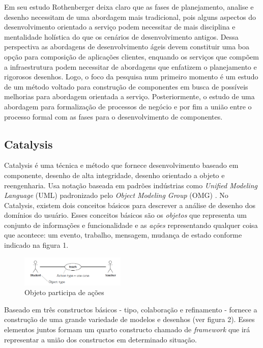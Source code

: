 \documentclass[
	article,			%
	11pt,				%
	oneside,			%
	a4paper,			%
	english,			%
	brazil,				%
	sumario=tradicional
	]{abntex2}
\begin{document}
Em seu estudo Rothenberger deixa claro que as fases de planejamento, analise e desenho necessitam de uma abordagem mais tradicional, pois alguns aspectos do desenvolvimento orientado a serviço podem necessitar de mais disciplina e mentalidade holística do que os cenários de desenvolvimento antigos. Dessa perspectiva as abordagens de desenvolvimento ágeis devem constituir uma boa opção para composição de aplicações clientes, enquando os serviços que compõem a infraestrutura podem necessitar de abordagens que enfatizem o planejamento e rigorosos desenhos\cite{Rothenberger2010}. Logo, o foco da pesquisa num primeiro momento é um estudo de um método voltado para construção de componentes em busca de possíveis melhorias para abordagem orientada a serviço. Posteriormente, o estudo de uma abordagem para formalização de processos de negócio e por fim a união entre o processo formal com as fases para o desenvolvimento de componentes.

\subsection{Catalysis}

Catalysis é uma técnica e método que fornece desenvolvimento baseado em componente, desenho de alta integridade, desenho orientado a objeto e reengenharia. Usa notação baseada em padrões indústrias como \textit{Unified Modeling Language} (UML) padronizado pelo \textit{Object Modeling Group} (OMG) \cite{DSouza1998}.
No Catalysis, existem dois conceitos básicos para descrever a análise de desenho dos domínios do usuário. Esses conceitos básicos são os \textit{objetos} que representa um conjunto de informações e funcionalidade e as \textit{ações} representando qualquer coisa que acontece: um evento, trabalho, mensagem, mudança de estado \cite{DSouza1998} conforme indicado na figura 1.

\begin{figure}[h]
	 \centering 
     \includegraphics[width=5cm]{Images/fig1.png}
     \caption{Objeto participa de ações}
     \label{Objeto participa de ações}
\end{figure}

Baseado em três constructos básicos - tipo, colaboração e refinamento - fornece a construção de uma grande variedade de modelos e desenhos (ver figura 2). Esses elementos juntos formam um quarto constructo chamado de \textit{framework} que irá representar a união dos constructos em determinado situação.
\end{document}
